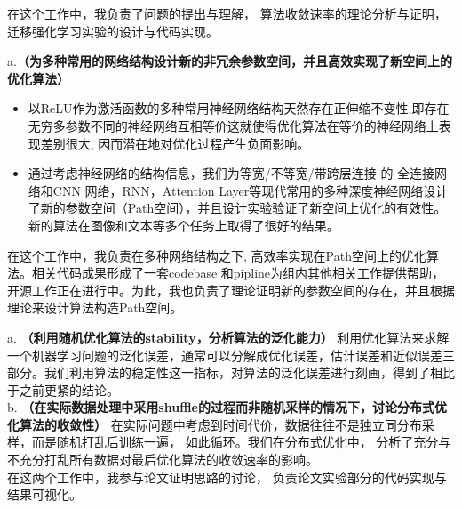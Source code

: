 \documentclass{resume}
\begin{document}
\faHandORight 在这个工作中，我负责了问题的提出与理解， 算法收敛速率的理论分析与证明，迁移强化学习实验的设计与代码实现。


a.\textbf{（为多种常用的网络结构设计新的非冗余参数空间，并且高效实现了新空间上的优化算法）} 

\begin{itemize}
  \item 以ReLU作为激活函数的多种常用神经网络结构天然存在正伸缩不变性,即存在无穷多参数不同的神经网络互相等价这就使得优化算法在等价的神经网络上表现差别很大, 因而潜在地对优化过程产生负面影响。
  \item 通过考虑神经网络的结构信息，我们为等宽/不等宽/带跨层连接 的 全连接网络和CNN 网络，RNN，Attention Layer等现代常用的多种深度神经网络设计了新的参数空间（Path空间），并且设计实验验证了新空间上优化的有效性。新的算法在图像和文本等多个任务上取得了很好的结果。
\end{itemize} 
    
 \faHandORight 在这个工作中，我负责在多种网络结构之下, 高效率实现在Path空间上的优化算法。相关代码成果形成了一套codebase 和pipline为组内其他相关工作提供帮助，开源工作正在进行中。为此，我也负责了理论证明新的参数空间的存在，并且根据理论来设计算法构造Path空间。
   

 a. \textbf{（利用随机优化算法的stability，分析算法的泛化能力）} 
 利用优化算法来求解一个机器学习问题的泛化误差，通常可以分解成优化误差，估计误差和近似误差三部分。我们利用算法的稳定性这一指标，对算法的泛化误差进行刻画，得到了相比于之前更紧的结论。 \\
 b. \textbf{（在实际数据处理中采用shuffle的过程而非随机采样的情况下，讨论分布式优化算法的收敛性）} 在实际问题中考虑到时间代价，数据往往不是独立同分布采样，而是随机打乱后训练一遍， 如此循环。我们在分布式优化中， 分析了充分与不充分打乱所有数据对最后优化算法的收敛速率的影响。\\
 \faHandORight 在这两个工作中，我参与论文证明思路的讨论， 负责论文实验部分的代码实现与结果可视化。
\end{document}
